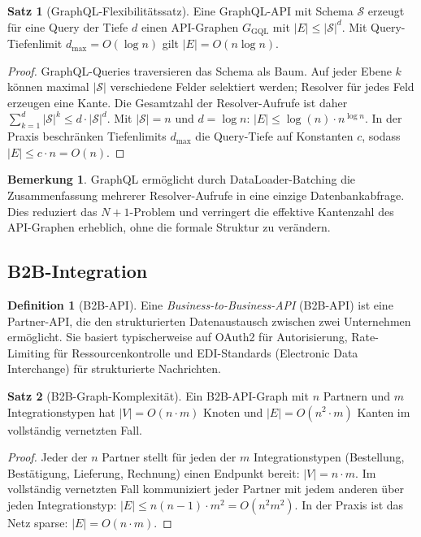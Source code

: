 ﻿\documentclass[a4paper,12pt]{article}
\theoremstyle{definition}
\newtheorem{definition}{Definition}
\newtheorem{satz}{Satz}
\newtheorem{bemerkung}{Bemerkung}
\begin{document}
\begin{satz}[GraphQL-Flexibilitätssatz]
  Eine GraphQL-API mit Schema $\mathcal{S}$ erzeugt für eine Query der Tiefe $d$
  einen API-Graphen $G_{\mathrm{GQL}}$ mit $|E| \leq |\mathcal{S}|^d$.
  Mit Query-Tiefenlimit $d_{\max} = O(\log n)$ gilt $|E| = O(n \log n)$.
\end{satz}

\begin{proof}
  GraphQL-Queries traversieren das Schema als Baum. Auf jeder Ebene $k$ können
  maximal $|\mathcal{S}|$ verschiedene Felder selektiert werden; Resolver für
  jedes Feld erzeugen eine Kante. Die Gesamtzahl der Resolver-Aufrufe ist daher
  $\sum_{k=1}^{d} |\mathcal{S}|^k \leq d \cdot |\mathcal{S}|^d$. Mit
  $|\mathcal{S}| = n$ und $d = \log n$: $|E| \leq \log(n) \cdot n^{\log n}$.
  In der Praxis beschränken Tiefenlimits $d_{\max}$ die Query-Tiefe auf Konstanten
  $c$, sodass $|E| \leq c \cdot n = O(n)$.
\end{proof}

\begin{bemerkung}
  GraphQL ermöglicht durch DataLoader-Batching die Zusammenfassung mehrerer
  Resolver-Aufrufe in eine einzige Datenbankabfrage. Dies reduziert das
  $N+1$-Problem und verringert die effektive Kantenzahl des API-Graphen
  erheblich, ohne die formale Struktur zu verändern.
\end{bemerkung}

\subsection{B2B-Integration}

\begin{definition}[B2B-API]
  Eine \emph{Business-to-Business-API} (B2B-API) ist eine Partner-API, die
  den strukturierten Datenaustausch zwischen zwei Unternehmen ermöglicht.
  Sie basiert typischerweise auf OAuth2 für Autorisierung, Rate-Limiting für
  Ressourcenkontrolle und EDI-Standards (Electronic Data Interchange) für
  strukturierte Nachrichten.
\end{definition}

\begin{satz}[B2B-Graph-Komplexität]
  Ein B2B-API-Graph mit $n$ Partnern und $m$ Integrationstypen hat
  $|V| = O(n \cdot m)$ Knoten und $|E| = O(n^2 \cdot m)$ Kanten im
  vollständig vernetzten Fall.
\end{satz}

\begin{proof}
  Jeder der $n$ Partner stellt für jeden der $m$ Integrationstypen
  (Bestellung, Bestätigung, Lieferung, Rechnung) einen Endpunkt bereit:
  $|V| = n \cdot m$. Im vollständig vernetzten Fall kommuniziert jeder
  Partner mit jedem anderen über jeden Integrationstyp:
  $|E| \leq n(n-1) \cdot m^2 = O(n^2 m^2)$. In der Praxis ist das Netz
  sparse: $|E| = O(n \cdot m)$.
\end{proof}
\end{document}
